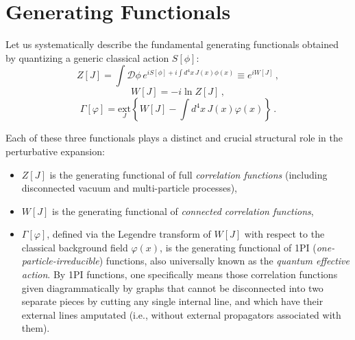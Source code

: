 \section{Generating Functionals}

Let us systematically describe the fundamental generating functionals obtained by quantizing a generic classical action \(S[\phi]\):
\begin{equation} \label{eq:partition_function_Z}
    Z[J] = \int \mathcal{D}\phi \, e^{iS[\phi] + i \int d^4x \, J(x)\phi(x)} \equiv e^{iW[J]} \, ,
\end{equation}
\begin{equation} \label{eq:connected_generator_W}
    W[J] = -i \ln Z[J] \, ,
\end{equation}
\begin{equation} \label{eq:effective_action_Gamma}
    \Gamma[\varphi] = \underset{J}{\text{ext}} \left\{ W[J] - \int d^4x \, J(x)\varphi(x) \right\} \, .
\end{equation}

Each of these three functionals plays a distinct and crucial structural role in the perturbative expansion:
\begin{itemize}
    \item \(Z[J]\) is the generating functional of full \textit{correlation functions} (including disconnected vacuum and multi-particle processes),
    \item \(W[J]\) is the generating functional of \textit{connected correlation functions},
    \item \(\Gamma[\varphi]\), defined via the Legendre transform of \(W[J]\) with respect to the classical background field \(\varphi(x)\), is the generating functional of 1PI (\textit{one-particle-irreducible}) functions, also universally known as the \textit{quantum effective action}. By 1PI functions, one specifically means those correlation functions given diagrammatically by graphs that cannot be disconnected into two separate pieces by cutting any single internal line, and which have their external lines amputated (i.e., without external propagators associated with them).
\end{itemize}

